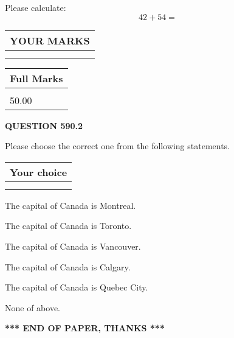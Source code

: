 \documentclass[12pt]{article}
\begin{document}
  
 
Please calculate:
\begin{equation}
42 +  %
54 = \nonumber
\end{equation}
 

 

 
  
\vspace{0.2in}
  
\noindent\begin{tabular}{|l|}
\hline
 YOUR MARKS  \\
\hline
 \\ 
 \\ 
\hline
\end{tabular}
\hspace{0.05in} \begin{tabular}{|l|}
\hline
 Full Marks  \\
\hline
 \\ 
50.00 \\
\hline
\end{tabular}
{\textbf{\Large{QUESTION
590.2 
}}}
  
  
Please choose the correct one from the following statements.
  
  
\noindent\hspace{3.0in} \begin{tabular}{|l|}
\hline
Your choice \\
\hline
 \\ 
 \\ 
\hline
\end{tabular}
  
  
 
 
The capital of Canada is Montreal.
 
 
The capital of Canada is Toronto.
 
 
The capital of Canada is Vancouver.
 
 
The capital of Canada is Calgary.
 
 
The capital of Canada is Quebec City.
 
 
 None of above.
 
 
   
   
 \vspace{0.2in}
 
   
   
   
   
\vspace{1.0in} 
{\textbf{\large{ *** END OF PAPER, THANKS *** }}} 
   
\end{document}

